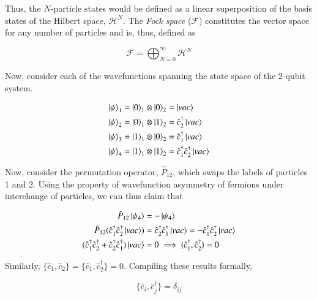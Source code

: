 \documentclass{resonance}
\begin{document}
Thus, the $N$-particle states would be defined as a linear superposition of the basis states of the Hilbert space, $\mathcal{H}^{N}$. The \textit{Fock space} ($\mathcal{F}$) constitutes the vector space for any number of particles and is, thus, defined as 

\begin{equation*}
    \mathcal{F} = \bigoplus _{N = 0}^{\infty} \mathcal{H}^{N}
\end{equation*}

Now, consider each of the wavefunctions spanning the state space of the 2-qubit system.

\begin{equation}
\begin{aligned}
    \ket{\psi}_{1} &= \ket{0}_{1} \otimes \ket{0}_{2} = \ket{vac}\\
    \ket{\psi}_{2} &= \ket{0}_{1} \otimes \ket{1}_{2} = \hat{c}_{2}^{\dagger}\ket{vac}\\
    \ket{\psi}_{3} &= \ket{1}_{1} \otimes \ket{0}_{2} = \hat{c}_{1}^{\dagger}\ket{vac}\\
    \ket{\psi}_{4} &= \ket{1}_{1} \otimes \ket{1}_{2} = \hat{c}_{1}^{\dagger} \hat{c}_{2}^{\dagger}\ket{vac}
\end{aligned}
\end{equation}

Now, consider the permutation operator, $\hat{P}_{12}$, which swaps the labels of particles 1 and 2. Using the property of wavefunction asymmetry of fermions under interchange of particles, we can thus claim that

\begin{equation}
\begin{aligned}
    \hat{P}_{12} \ket{\psi_{4}} &= -\ket{\psi_{4}} \\
    \hat{P}_{12} (\hat{c}_{1}^{\dagger} \hat{c}_{2}^{\dagger}\ket{vac}) &= \hat{c}_{2}^{\dagger} \hat{c}_{1}^{\dagger}\ket{vac} = -\hat{c}_{1}^{\dagger} \hat{c}_{2}^{\dagger}\ket{vac}\\
    (\hat{c}_{1}^{\dagger} \hat{c}_{2}^{\dagger} + \hat{c}_{2}^{\dagger} \hat{c}_{1}^{\dagger})\ket{vac} &= 0 \implies \{\hat{c}_{1}^{\dagger}, \hat{c}_{2}^{\dagger}\} = 0
\end{aligned}
\end{equation}

Similarly, $\{\hat{c}_{1}, \hat{c}_{2}\} = \{\hat{c}_{1}, \hat{c}_{2}^{\dagger}\} = 0$. Compiling these results formally,

\begin{equation}
    \{\hat{c}_{i}, \hat{c}_{j}^{\dagger}\} = \delta_{ij}
\end{equation} 
\end{document}
